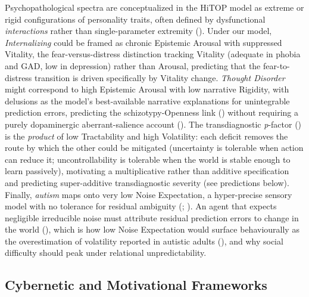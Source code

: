 \documentclass[
  jou,
  floatsintext,
  longtable,
  nolmodern,
  notxfonts,
  notimes,
  12pt,
  colorlinks=true,linkcolor=blue,citecolor=blue,urlcolor=blue]{apa7}
\begin{document}
Psychopathological spectra are conceptualized in the HiTOP model as
extreme or rigid configurations of personality traits, often defined by
dysfunctional \emph{interactions} rather than single-parameter extremity
(). Under our model,
\emph{Internalizing} could be framed as chronic Epistemic Arousal with
suppressed Vitality, the fear-versus-distress distinction tracking
Vitality (adequate in phobia and GAD, low in depression) rather than
Arousal, predicting that the fear-to-distress transition is driven
specifically by Vitality change. \emph{Thought Disorder} might
correspond to high Epistemic Arousal with low narrative Rigidity, with
delusions as the model's best-available narrative explanations for
unintegrable prediction errors, predicting the schizotypy-Openness link
() without requiring a
purely dopaminergic aberrant-salience account
(). The transdiagnostic
\emph{p}-factor () is
the \emph{product} of low Tractability and high Volatility: each deficit
removes the route by which the other could be mitigated (uncertainty is
tolerable when action can reduce it; uncontrollability is tolerable when
the world is stable enough to learn passively), motivating a
multiplicative rather than additive specification and predicting
super-additive transdiagnostic severity (see predictions below).
Finally, \emph{autism} maps onto very low Noise Expectation, a
hyper-precise sensory model with no tolerance for residual ambiguity
(;
). An
agent that expects negligible irreducible noise must attribute residual
prediction errors to change in the world
(), which is how low
Noise Expectation would surface behaviourally as the overestimation of
volatility reported in autistic adults
(), and why social
difficulty should peak under relational unpredictability.

\subsection{Cybernetic and Motivational
Frameworks}\label{cybernetic-and-motivational-frameworks}
\end{document}
